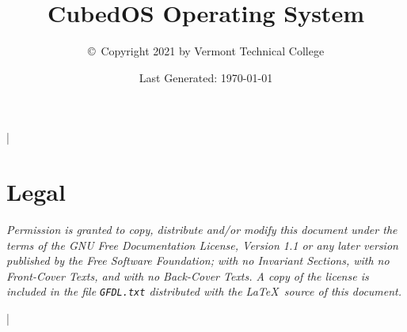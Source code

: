 \documentclass{scrreprt}
\begin{document}
\title{CubedOS Operating System}
\author{\copyright\ Copyright 2021 by Vermont Technical College}
\date{Last Generated: \today}
\maketitle

\tableofcontents

\lstMakeShortInline|

\section*{Legal}
\label{sec:legal}

\textit{Permission is granted to copy, distribute and/or modify this document under the terms of
  the GNU Free Documentation License, Version 1.1 or any later version published by the Free
  Software Foundation; with no Invariant Sections, with no Front-Cover Texts, and with no
  Back-Cover Texts. A copy of the license is included in the file \texttt{GFDL.txt} distributed
  with the \LaTeX\ source of this document.}






\newpage

\newpage


\lstDeleteShortInline|




\end{document}
